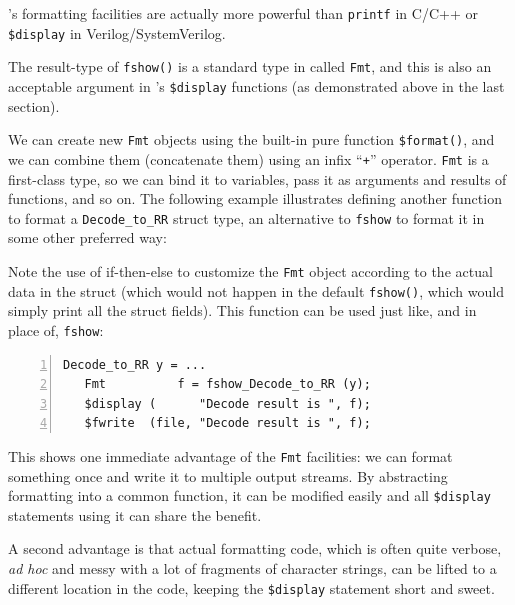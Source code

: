 \label{Sec_Fmt_formatted_values}


{\BSV}'s formatting facilities are actually more powerful than
\verb|printf| in C/C++ or \verb|$display| in Verilog/SystemVerilog.

The result-type of \verb|fshow()| is a standard type in {\BSV} called
\verb|Fmt|, and this is also an acceptable argument in {\BSV}'s
\verb|$display| functions (as demonstrated above in the last section).

We can create new \verb|Fmt| objects using the built-in pure function
\verb|$format()|, and we can combine them (concatenate them) using an
infix ``\verb|+|'' operator.  \verb|Fmt| is a first-class type, so we
can bind it to variables, pass it as arguments and results of
functions, and so on.  The following example illustrates defining
another function to format a \verb|Decode_to_RR| struct type, an
alternative to \verb|fshow| to format it in some other preferred way:


Note the use of if-then-else to customize the \verb|Fmt| object
according to the actual data in the struct (which would not happen in
the default \verb|fshow()|, which would simply print all the struct
fields).  This function can be used just like, and in place of,
\verb|fshow|:

{\footnotesize
\begin{Verbatim}[frame=single, numbers=left]
   Decode_to_RR y = ...
   Fmt          f = fshow_Decode_to_RR (y);
   $display (      "Decode result is ", f);
   $fwrite  (file, "Decode result is ", f);
\end{Verbatim}
}

This shows one immediate advantage of the \verb|Fmt| facilities: we
can format something once and write it to multiple output streams.  By
abstracting formatting into a common function, it can be modified
easily and all \verb|$display| statements using it can share the
benefit.

A second advantage is that actual formatting code, which is often
quite verbose, \emph{ad hoc} and messy with a lot of fragments of
character strings, can be lifted to a different location in the code,
keeping the \verb|$display| statement short and sweet.


